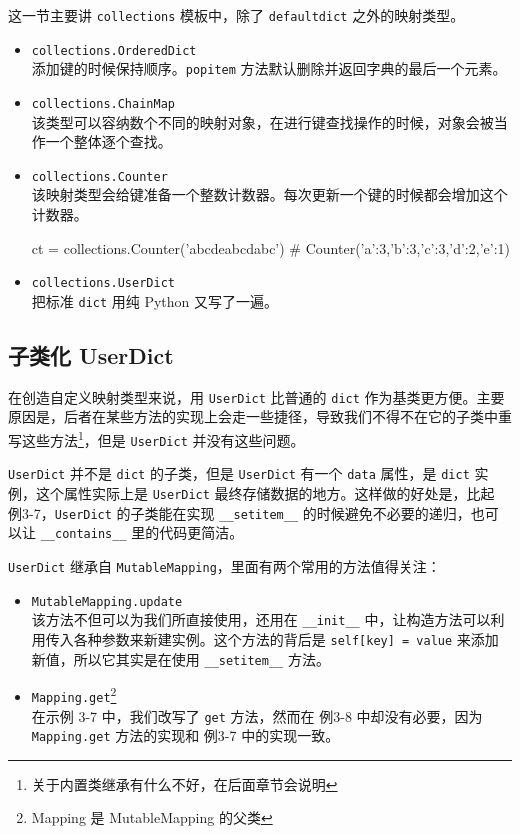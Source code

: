 这一节主要讲 \texttt{collections} 模板中，除了 \texttt{defaultdict} 之外的映射类型。

\begin{itemize}
    \item \texttt{collections.OrderedDict} \\
    添加键的时候保持顺序。\texttt{popitem} 方法默认删除并返回字典的最后一个元素。
    \item \texttt{collections.ChainMap}  \\
    该类型可以容纳数个不同的映射对象，在进行键查找操作的时候，对象会被当作一个整体逐个查找。
    \item \texttt{collections.Counter}  \\
    该映射类型会给键准备一个整数计数器。每次更新一个键的时候都会增加这个计数器。
    \begin{python}
        ct = collections.Counter('abcdeabcdabc') # Counter({'a':3,'b':3,'c':3,'d':2,'e':1})
    \end{python}
    \item \texttt{collections.UserDict} \\
    把标准 \texttt{dict} 用纯 Python 又写了一遍。
\end{itemize}

\subsection{子类化 UserDict}

在创造自定义映射类型来说，用 \texttt{UserDict} 比普通的 \texttt{dict} 作为基类更方便。主要原因是，后者在某些方法的实现上会走一些捷径，导致我们不得不在它的子类中重写这些方法\footnote{关于内置类继承有什么不好，在后面章节会说明}，但是 \texttt{UserDict} 并没有这些问题。

\texttt{UserDict} 并不是 \texttt{dict} 的子类，但是 \texttt{UserDict} 有一个 \texttt{data} 属性，是 \texttt{dict} 实例，这个属性实际上是 \texttt{UserDict} 最终存储数据的地方。这样做的好处是，比起 例3-7，\texttt{UserDict} 的子类能在实现 \texttt{\_\_setitem\_\_} 的时候避免不必要的递归，也可以让 \texttt{\_\_contains\_\_} 里的代码更简洁。



\texttt{UserDict} 继承自 \texttt{MutableMapping}，里面有两个常用的方法值得关注：

\begin{itemize}
    \item \texttt{MutableMapping.update} \\
    该方法不但可以为我们所直接使用，还用在 \texttt{\_\_init\_\_} 中，让构造方法可以利用传入各种参数来新建实例。这个方法的背后是 \texttt{self[key] = value} 来添加新值，所以它其实是在使用 \texttt{\_\_setitem\_\_} 方法。
    \item \texttt{Mapping.get}\footnote{Mapping 是 MutableMapping 的父类} \\
    在示例 3-7 中，我们改写了 \texttt{get} 方法，然而在 例3-8 中却没有必要，因为 \texttt{Mapping.get} 方法的实现和 例3-7 中的实现一致。
\end{itemize}

